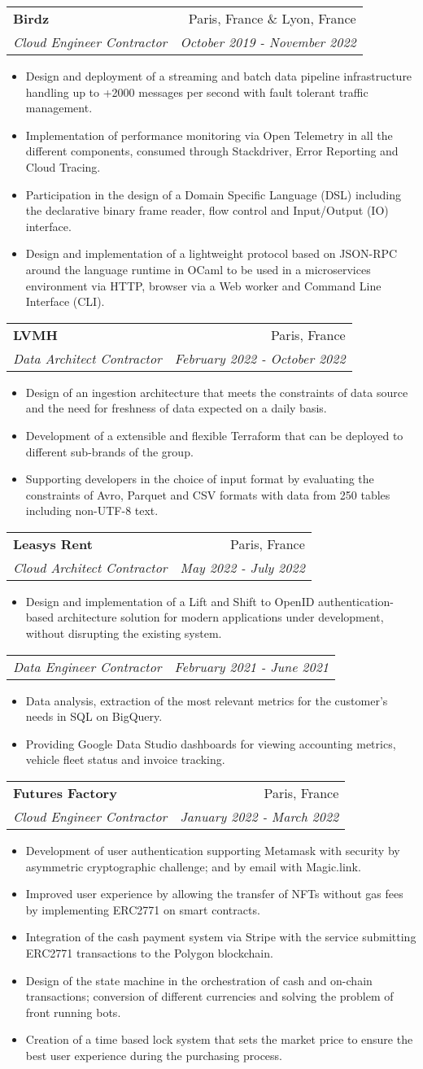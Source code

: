 \documentclass[letterpaper,11pt]{article}
\makeatletter
\newcommand{\resumeItem}[1]{
  \item\small{#1 \vspace{-2pt}}
}
\newcommand{\resumeSubheading}[4]{
  \vspace{-1pt}\item
    \begin{tabular*}{0.97\textwidth}[t]{l@{\extracolsep{\fill}}r}
      \textbf{#1} & #2 \\
      \textit{\small#3} & \textit{\small #4} \\
    \end{tabular*}\vspace{-5pt}
}
\newcommand{\resumeSubSubheading}[2]{
  \begin{tabular*}{0.97\textwidth}{l@{\extracolsep{\fill}}r}
    \textit{\small#1} & \textit{\small #2} \\
  \end{tabular*}\vspace{-5pt}
}
\newcommand{\resumeItemListStart}{\begin{itemize}}
\newcommand{\resumeItemListEnd}{\end{itemize}\vspace{-5pt}}
\makeatother
\begin{document}
\resumeSubheading{Birdz}
{Paris, France \& Lyon, France}
{Cloud Engineer Contractor}
{October 2019 - November 2022}
\resumeItemListStart{}
\resumeItem{
	Design and deployment of a streaming and batch data pipeline infrastructure
	handling up to +2000 messages per second with fault tolerant traffic management.
}
\resumeItem{
	Implementation of performance monitoring via Open Telemetry in all the different
	components, consumed through Stackdriver, Error Reporting and Cloud Tracing.
}
\resumeItem{
	Participation in the design of a Domain Specific Language (DSL) including the
	declarative binary frame reader, flow control and Input/Output (IO)
	interface.
}
\resumeItem{
	Design and implementation of a lightweight protocol based on JSON-RPC around the
	language runtime in OCaml to be used in a microservices environment via HTTP,
	browser via a Web worker and Command Line Interface (CLI).
}
\resumeItemListEnd{}


\resumeSubheading{LVMH}
{Paris, France}
{Data Architect Contractor}
{February 2022 - October 2022}
\resumeItemListStart{}
\resumeItem{
	Design of an ingestion architecture that meets the constraints of data source
	and the need for freshness of data expected on a daily basis.
}
\resumeItem{
	Development of a extensible and flexible Terraform that can be deployed to
	different sub-brands of the group.
}
\resumeItem{
	Supporting developers in the choice of input format by evaluating the
	constraints of Avro, Parquet and CSV formats with data from 250 tables including
	non-UTF-8 text.
}
\resumeItemListEnd{}


\resumeSubheading{Leasys Rent}
{Paris, France}
{Cloud Architect Contractor}
{May 2022 - July 2022}
\resumeItemListStart{}
\resumeItem{
	Design and implementation of a Lift and Shift to OpenID authentication-based
	architecture solution for modern applications under development, without
	disrupting the existing system.
}
\resumeItemListEnd{}

\resumeSubSubheading{Data Engineer Contractor}
{February 2021 - June 2021}
\resumeItemListStart{}
\resumeItem{
	Data analysis, extraction of the most relevant metrics for the
	customer's needs in SQL on BigQuery.
}
\resumeItem{
	Providing Google Data Studio dashboards for viewing accounting metrics, vehicle
	fleet status and invoice tracking.
}
\resumeItemListEnd{}

\resumeSubheading{Futures Factory}
{Paris, France}
{Cloud Engineer Contractor}
{January 2022 - March 2022}
\resumeItemListStart{}
\resumeItem{
	Development of user authentication supporting Metamask with security by
	asymmetric cryptographic challenge; and by email with Magic.link.
}
\resumeItem{
	Improved user experience by allowing the transfer of NFTs without gas fees by
	implementing ERC2771 on smart contracts.
}
\resumeItem{
	Integration of the cash payment system via Stripe with the service submitting
	ERC2771 transactions to the Polygon blockchain.
}
\resumeItem{
	Design of the state machine in the orchestration of cash and on-chain
	transactions; conversion of different currencies and solving the problem of
	front running bots.
}
\resumeItem{
	Creation of a time based lock system that sets the market price to ensure the
	best user experience during the purchasing process.
}
\resumeItemListEnd{}
\end{document}
